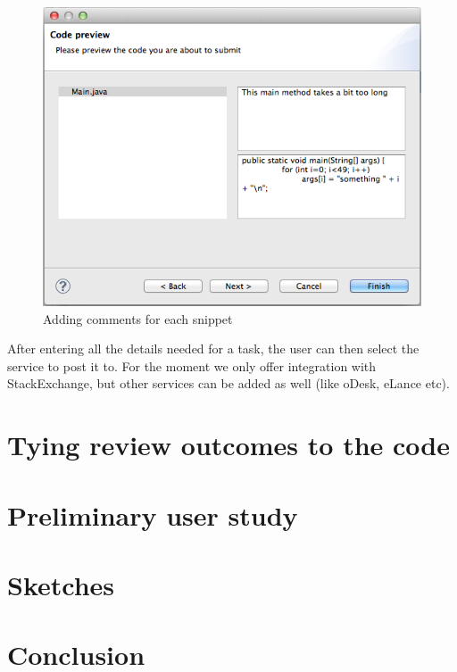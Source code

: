 \documentclass{sigchi}
\begin{document}
\begin{figure}[hbt]
	\includegraphics[width=\columnwidth]{wizard.png}
\caption{Adding comments for each snippet}
\label{fig:wizard}
\end{figure}

After entering all the details needed for a task, the user can then select the service to post it to. For the
moment we only offer integration with StackExchange, but other services can be added as well (like
oDesk, eLance etc). 

\section{Tying review outcomes to the code}
\section{Preliminary user study}
\section{Sketches}
\section{Conclusion}



\end{document}
